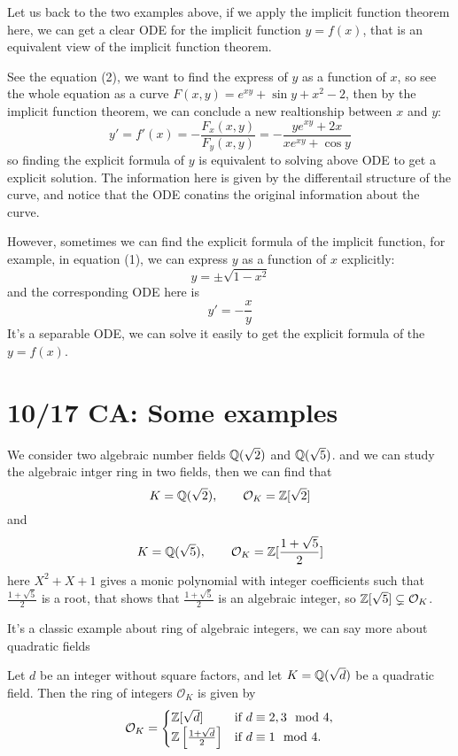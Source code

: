 \documentclass[12pt,a4paper]{article}
\begin{document}
Let us back to the two examples above, if we apply the implicit function theorem here, we can get a clear ODE for the implicit function \(y=f(x)\), that is an equivalent view of the implicit function theorem.
\begin{example}
    See the equation (2), we want to find the express of \(y\) as a function of \(x\), so see the whole equation as a curve \(F(x,y) = e^{xy} + \sin y + x^2 - 2\), then by the implicit function theorem, we can conclude a new realtionship between \(x\) and \(y\):
     \[y' = f'(x) = -\frac{F_x(x,y)}{F_y(x,y)} = -\frac{ye^{xy} + 2x}{xe^{xy} + \cos y}\]
    so finding the explicit formula of \(y\) is equivalent to solving above ODE to get a explicit solution. The information here is given by the differentail structure of the curve, and notice that the ODE conatins the original information about the curve.

    However, sometimes we can find the explicit formula of the implicit function, for example, in equation (1), we can express \(y\) as a function of \(x\) explicitly:
    \[y = \pm \sqrt{1-x^2}\]
    and the corresponding ODE here is \[y' = -\frac{x}{y}\]
    It's a separable ODE, we can solve it easily to get the explicit formula of the \(y=f(x)\).
    
\end{example}

\section{10/17 CA: Some examples}
\begin{example}
    We consider two algebraic number fields \(\mathbb{Q}(\sqrt{2})\) and \(\mathbb{Q}(\sqrt{5})\). and we can study the algebraic intger ring in two fields, then we can find that
    \[K = \mathbb{Q}(\sqrt{2}), \qquad \mathcal{O}_K  = \mathbb{Z}[\sqrt{2}]\]
    and 
    \[K = \mathbb{Q}(\sqrt{5}), \qquad \mathcal{O}_K  = \mathbb{Z}[\frac{1+\sqrt{5}}{2}]\]
    here \(X^2+X+1\) gives a monic polynomial with integer coefficients such that \(\frac{1+\sqrt{5}}{2}\) is a root, that shows that \(\frac{1+\sqrt{5}}{2}\) is an algebraic integer, so \(\mathbb{Z}[\sqrt{5}] \subsetneq \mathcal{O}_K\).
\end{example}

It's a classic example about ring of algebraic integers, we can say more about quadratic fields

\begin{theorem}
    Let \(d\) be an integer without square factors, and let \(K = \mathbb{Q}(\sqrt{d})\) be a quadratic field. Then the ring of integers \(\mathcal{O}_K\) is given by
    \[
    \mathcal{O}_K = 
    \begin{cases}
        \mathbb{Z}[\sqrt{d}] & \text{if } d \equiv 2, 3 \mod 4, \\
        \mathbb{Z}\left[\frac{1 + \sqrt{d}}{2}\right] & \text{if } d \equiv 1 \mod 4.
    \end{cases}
    \]
\end{theorem}
\end{document}
